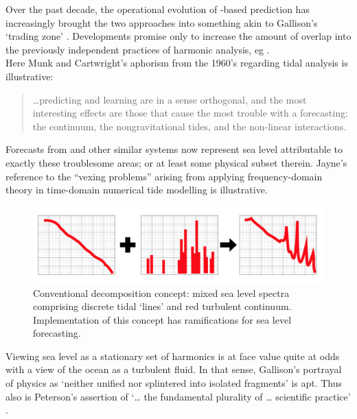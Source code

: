 Over the past decade, the operational evolution of \OGCM-based prediction has increasingly brought the two approaches into something akin to Gallison's `trading zone' \citep{Galison:1996uc}.
Developments promise only to increase the amount of overlap into the previously independent practices of harmonic analysis, eg \cite{Arbic:2010us}.\\
Here Munk and Cartwright's aphorism from the 1960's regarding tidal analysis is illustrative:
\begin{quote}
  \dots predicting and learning are in a sense orthogonal, and the most interesting effects are those that cause the most trouble with a forecasting: the continuum, the nongravitational tides, and the non-linear interactions.\citep{Munk:1966ts} 
\end{quote}
Forecasts from \BL{} and other similar systems now represent sea level attributable to exactly these troublesome areas; or at least some physical subset therein.
Jayne's reference to the ``vexing problems'' \citep[pp812]{Jayne:2001tr} arising from applying frequency-domain theory in time-domain numerical tide modelling is illustrative.

\begin{figure}[H]\centering
  \includegraphics[width=\figwidthBig]{figures/diagrams/spectra_cartoon_1.png}
  \caption{Conventional decomposition concept: mixed sea level spectra comprising discrete tidal `lines' and red turbulent continuum.  Implementation of this concept has ramifications for sea level forecasting.}
  \label{fig:SPECTRA_CARTOON}
\end{figure}

Viewing sea level as a stationary set of harmonics is at face value quite at odds with a view of the ocean as a turbulent fluid.   In that sense, Gallison's portrayal of physics as `neither unified nor splintered into isolated fragments' \citep[pp 782]{Galison:1987wh} is apt.  Thus also is Peterson's assertion of `\dots{} the fundamental plurality of \dots{} scientific practice' \cite{Petersen:2012tr}. 

